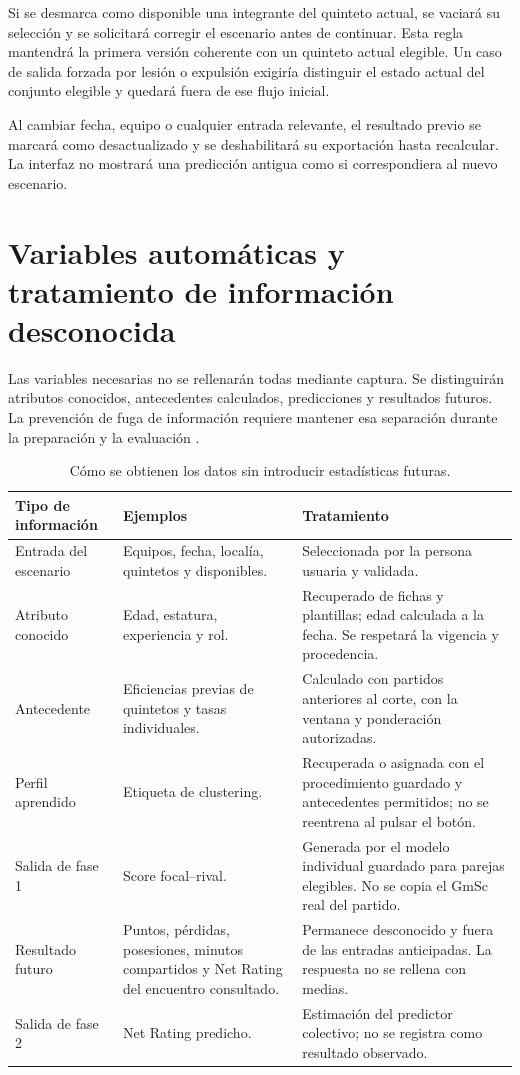 Si se desmarca como disponible una integrante del quinteto actual, se vaciará su selección y se solicitará corregir el escenario antes de continuar. Esta regla mantendrá la primera versión coherente con un quinteto actual elegible. Un caso de salida forzada por lesión o expulsión exigiría distinguir el estado actual del conjunto elegible y quedará fuera de ese flujo inicial.

Al cambiar fecha, equipo o cualquier entrada relevante, el resultado previo se marcará como desactualizado y se deshabilitará su exportación hasta recalcular. La interfaz no mostrará una predicción antigua como si correspondiera al nuevo escenario.

\section{Variables automáticas y tratamiento de información desconocida}
\label{sec:variables-desconocidas-pruebas}
Las variables necesarias no se rellenarán todas mediante captura. Se distinguirán atributos conocidos, antecedentes calculados, predicciones y resultados futuros. La prevención de fuga de información requiere mantener esa separación durante la preparación y la evaluación \cite{sklearnCommonPitfallsPonderacion}.

\begin{table}[htbp]
\centering\small
\caption{Cómo se obtienen los datos sin introducir estadísticas futuras.}
\label{tab:origen-variables-interfaz}
\begin{tabularx}{\textwidth}{@{}p{3.0cm}XX@{}}
\toprule
\textbf{Tipo de información}&\textbf{Ejemplos}&\textbf{Tratamiento}\\\midrule
Entrada del escenario & Equipos, fecha, localía, quintetos y disponibles. & Seleccionada por la persona usuaria y validada.\\
Atributo conocido & Edad, estatura, experiencia y rol. & Recuperado de fichas y plantillas; edad calculada a la fecha. Se respetará la vigencia y procedencia.\\
Antecedente & Eficiencias previas de quintetos y tasas individuales. & Calculado con partidos anteriores al corte, con la ventana y ponderación autorizadas.\\
Perfil aprendido & Etiqueta de clustering. & Recuperada o asignada con el procedimiento guardado y antecedentes permitidos; no se reentrena al pulsar el botón.\\
Salida de fase 1 & Score focal--rival. & Generada por el modelo individual guardado para parejas elegibles. No se copia el GmSc real del partido.\\
Resultado futuro & Puntos, pérdidas, posesiones, minutos compartidos y Net Rating del encuentro consultado. & Permanece desconocido y fuera de las entradas anticipadas. La respuesta no se rellena con medias.\\
Salida de fase 2 & Net Rating predicho. & Estimación del predictor colectivo; no se registra como resultado observado.\\
\bottomrule
\end{tabularx}
\end{table}

